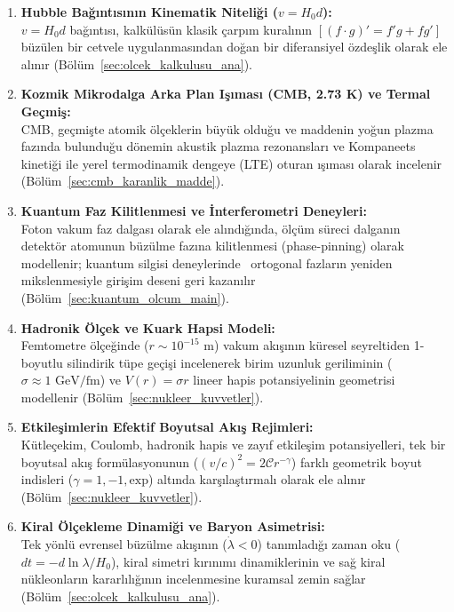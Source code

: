 \begin{enumerate}
      \item \textbf{Hubble Bağıntısının Kinematik Niteliği ($v = H_0 d$):} \\
            $v = H_0 d$ bağıntısı, kalkülüsün klasik çarpım kuralının $[(f\cdot g)' = f'g + fg']$ büzülen bir cetvele uygulanmasından doğan bir diferansiyel özdeşlik olarak ele alınır (Bölüm~\ref{sec:olcek_kalkulusu_ana}).

      \item \textbf{Kozmik Mikrodalga Arka Plan Işıması (CMB, 2.73 K) ve Termal Geçmiş:} \\
            CMB, geçmişte atomik ölçeklerin büyük olduğu ve maddenin yoğun plazma fazında bulunduğu dönemin akustik plazma rezonansları ve Kompaneets kinetiği ile yerel termodinamik dengeye (LTE) oturan ışıması olarak incelenir (Bölüm~\ref{sec:cmb_karanlik_madde}).

      \item \textbf{Kuantum Faz Kilitlenmesi ve İnterferometri Deneyleri:} \\
            Foton vakum faz dalgası olarak ele alındığında, ölçüm süreci dalganın detektör atomunun büzülme fazına kilitlenmesi (phase-pinning) olarak modellenir; kuantum silgisi deneylerinde~\cite{scully1982,kim2000} ortogonal fazların yeniden mikslenmesiyle girişim deseni geri kazanılır (Bölüm~\ref{sec:kuantum_olcum_main}).

      \item \textbf{Hadronik Ölçek ve Kuark Hapsi Modeli:} \\
            Femtometre ölçeğinde ($r \sim 10^{-15}\text{ m}$) vakum akışının küresel seyreltiden 1-boyutlu silindirik tüpe geçişi incelenerek birim uzunluk geriliminin ($\sigma \approx 1\text{ GeV/fm}$) ve $V(r) = \sigma r$ lineer hapis potansiyelinin geometrisi modellenir (Bölüm~\ref{sec:nukleer_kuvvetler}).

      \item \textbf{Etkileşimlerin Efektif Boyutsal Akış Rejimleri:} \\
            Kütleçekim, Coulomb, hadronik hapis ve zayıf etkileşim potansiyelleri, tek bir boyutsal akış formülasyonunun ($(v/c)^2 = 2\mathcal{C}r^{-\gamma}$) farklı geometrik boyut indisleri ($\gamma = 1, -1, \text{exp}$) altında karşılaştırmalı olarak ele alınır (Bölüm~\ref{sec:nukleer_kuvvetler}).

      \item \textbf{Kiral Ölçekleme Dinamiği ve Baryon Asimetrisi:} \\
            Tek yönlü evrensel büzülme akışının ($\dot{\lambda} < 0$) tanımladığı zaman oku ($dt = -d\ln\lambda/H_0$), kiral simetri kırınımı dinamiklerinin ve sağ kiral nükleonların kararlılığının incelenmesine kuramsal zemin sağlar (Bölüm~\ref{sec:olcek_kalkulusu_ana}).


\end{enumerate}
